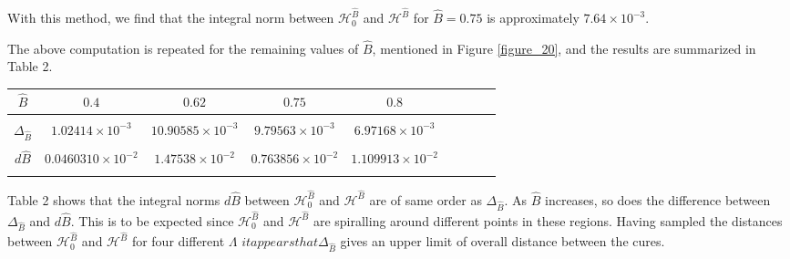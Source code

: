 \documentclass{ws-ijbc}
\begin{document}
With this method, we find that the integral norm between $\mathscr{H}_0^{\widehat{B}}$ and $\mathscr{H}^{\widehat{B}}$ for $\widehat{B} = 0.75$ is approximately $7.64 \times 10^{-3}$.

The above computation is repeated for the remaining values of $\widehat{B}$, mentioned in Figure \ref{figure_20}, and the results are summarized in Table 2.
  
\begin{table}[h]
        {\begin{tabular}{c  c  c  c  c  c  c  c  c} \\[-2pt]
            \toprule
            $\widehat{B}$ & $0.4$ & $0.62$ & $0.75$ & $0.8$  \\[6pt]
            \hline\\[-6pt]
            $\Delta_{\widehat{B}}$ & $1.02414 \times 10^{-3}$ & $10.90585 \times 10^{-3}$ & $9.79563 \times 10^{-3}$ & $6.97168 \times 10^{-3}$ \\[6pt]
            \hline\\[-6pt]
            $d\widehat{B}$ & $0.0460310 \times 10^{-2}$ & $1.47538 \times 10^{-2}$ & $0.763856 \times 10^{-2}$ & $1.109913 \times 10^{-2}$ \\[1pt]
            \botrule
        \end{tabular}}
\end{table}

Table 2 shows that the integral norms $d\widehat{B}$ between $\mathscr{H}_0^{\widehat{B}}$ and $\mathscr{H}^{\widehat{B}}$ are of same order as $\Delta_{\widehat{B}}$.  As $\widehat{B}$ increases, so does the difference between $\Delta_{\widehat{B}}$ and $d\widehat{B}$.  This is to be expected since $\mathscr{H}_0^{\widehat{B}}$ and $\mathscr{H}^{\widehat{B}}$ are spiralling around different points in these regions.  Having sampled the distances between $\mathscr{H}_0^{\widehat{B}}$ and $\mathscr{H}^{\widehat{B}}$ for four different $\Lambda$ $it appears that \Delta_{\widehat{B}}$ gives an upper limit of overall distance between the cures.




\newpage

\end{document}

